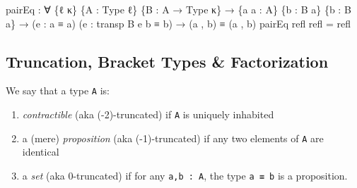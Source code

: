 \documentclass[
  11pt,
  oneside,
  article]{memoir}
\newenvironment{Shaded}{}{}
\newcommand{\NormalTok}[1]{#1}
\newcommand{\OtherTok}[1]{\textcolor[rgb]{0.00,0.44,0.13}{#1}}
\providecommand{\tightlist}{%
  \setlength{\itemsep}{0pt}\setlength{\parskip}{0pt}}
\theoremstyle{definition}
\theoremstyle{plain}
\newcommand{\0}{\textsf{0}}
\newcommand{\1}{\tn{\textsf{1}}}
\begin{document}
\begin{Shaded}
\begin{Highlighting}[]
\NormalTok{pairEq }\OtherTok{:} \OtherTok{∀} \OtherTok{\{}\NormalTok{ℓ κ}\OtherTok{\}} \OtherTok{\{}\NormalTok{A }\OtherTok{:}\NormalTok{ Type ℓ}\OtherTok{\}} \OtherTok{\{}\NormalTok{B }\OtherTok{:}\NormalTok{ A }\OtherTok{→}\NormalTok{ Type κ}\OtherTok{\}} 
         \OtherTok{→} \OtherTok{\{}\NormalTok{a a\textquotesingle{} }\OtherTok{:}\NormalTok{ A}\OtherTok{\}} \OtherTok{\{}\NormalTok{b }\OtherTok{:}\NormalTok{ B a}\OtherTok{\}} \OtherTok{\{}\NormalTok{b\textquotesingle{} }\OtherTok{:}\NormalTok{ B a\textquotesingle{}}\OtherTok{\}}
         \OtherTok{→} \OtherTok{(}\NormalTok{e }\OtherTok{:}\NormalTok{ a ≡ a\textquotesingle{}}\OtherTok{)} \OtherTok{(}\NormalTok{e\textquotesingle{} }\OtherTok{:}\NormalTok{ transp B e b ≡ b\textquotesingle{}}\OtherTok{)} 
         \OtherTok{→} \OtherTok{(}\NormalTok{a , b}\OtherTok{)}\NormalTok{ ≡ }\OtherTok{(}\NormalTok{a\textquotesingle{} , b\textquotesingle{}}\OtherTok{)}
\NormalTok{pairEq refl refl }\OtherTok{=}\NormalTok{ refl}
\end{Highlighting}
\end{Shaded}

\subsection{Truncation, Bracket Types \&
Factorization}\label{truncation-bracket-types-factorization}

We say that a type \texttt{A} is:

\begin{enumerate}
\def\labelenumi{\arabic{enumi}.}
\tightlist
\item
  \emph{contractible} (aka (-2)-truncated) if \texttt{A} is uniquely
  inhabited
\item
  a (mere) \emph{proposition} (aka (-1)-truncated) if any two elements
  of \texttt{A} are identical
\item
  a \emph{set} (aka 0-truncated) if for any \texttt{a,b\ :\ A}, the type
  \texttt{a\ ≡\ b} is a proposition.
\end{enumerate}
\end{document}
